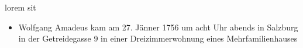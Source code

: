 \documentclass{article}
\begin{document}
lorem  sit

\begin{itemize}
\item Wolfgang Amadeus  kam am 27. Jänner 1756 um acht Uhr
abends in Salzburg in der Getreidegasse 9 in einer Dreizimmerwohnung
eines Mehrfamilienhauses
\end{itemize}
\end{document}

